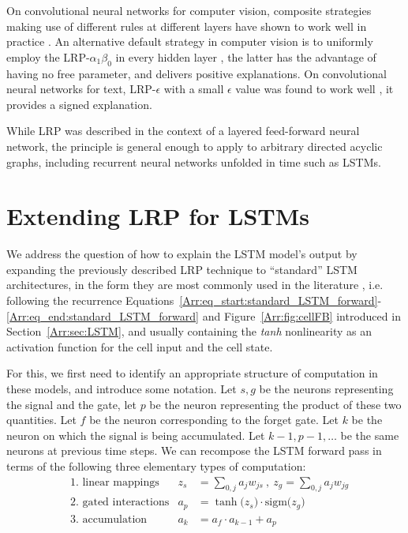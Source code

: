 \documentclass[runningheads]{llncs}
\begin{document}
On convolutional neural networks for computer vision, composite strategies making use of different rules at different layers have shown to work well in practice \cite{Arr:lapuschkin2017faces,Arr:montavon2019overview}. 
An alternative default strategy in computer vision is to uniformly employ the LRP-$\alpha_1\beta_0$ in every hidden layer \cite{Arr:Montavon:DSP18}, the latter has the advantage of having no free parameter, and delivers positive explanations.
On convolutional neural networks for text, LRP-$\epsilon$ with a small $\epsilon$ value  was found to work well \cite{Arr:Arras:PLOSONE2017,Arr:Poerner:ACL2018}, it provides a signed explanation.

\medskip

While LRP was described in the context of a layered feed-forward neural network, the principle is general enough to apply to arbitrary directed acyclic graphs, including recurrent neural networks unfolded in time such as LSTMs.

\section{Extending LRP for LSTMs}
We address the question of how to explain the LSTM model's output by expanding the previously described LRP technique to ``standard'' LSTM architectures, in the form they are most commonly used in the literature \cite{Arr:Greff:15}, i.e. following the recurrence Equations~\ref{Arr:eq_start:standard_LSTM_forward}-\ref{Arr:eq_end:standard_LSTM_forward} and Figure~\ref{Arr:fig:cellFB} introduced in Section~\ref{Arr:sec:LSTM}, and usually containing the {\it tanh} nonlinearity as an activation function for the cell input and the cell state.

For this, we first need to identify an appropriate structure of computation in these models, and introduce some notation. Let $s,g$ be the neurons representing the signal and the gate, let $p$ be the neuron representing the product of these two quantities. Let $f$ be the neuron corresponding to the forget gate. Let $k$ be the neuron on which the signal is being accumulated. Let $k-1, p-1,\dots$ be the same neurons at previous time steps. We can recompose the LSTM forward pass in terms of the following three elementary types of computation:
\begin{align*}
& \text{1.~linear mappings} & z_s &= \textstyle  \sum_{0,j} a_j w_{js} ~,~ z_g = \textstyle  \sum_{0,j} a_j w_{jg}\\
& \text{2.~gated interactions} & a_p &=  \tanh\big(z_s \big) \cdot \mathrm{sigm} \big( z_g \big)\\
&\text{3.~accumulation} & a_k &=  a_f \cdot a_{k-1} + a_p
\end{align*}
\end{document}
